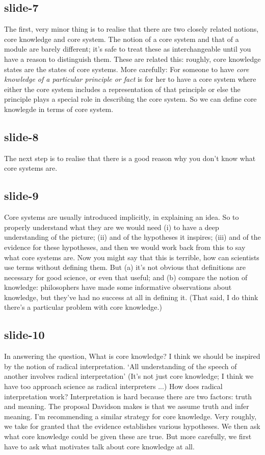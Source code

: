 \documentclass[12pt,\papersize]{extarticle}
\begin{document}
 
\subsection{slide-7}
The first, very minor thing is to realise that there are two closely related notions, core knowledge and core system.
The notion of a core system and that of a module are barely different; it's safe to treat these as interchangeable until you have a reason to distinguish them.
These are related this: roughly, core knowledge states are the states of core systems. More carefully:
For someone to have \textit{core knowledge of a particular principle or fact} is for her to have a core system where either the core system includes a representation of that principle or else the principle plays a special role in describing the core system.
So we can define core knowlegde in terms of core system.
 
 
\subsection{slide-8}
The next step is to realise that there is a good reason why you don't know what core systems are.
 
 
\subsection{slide-9}
Core systems are usually introduced implicitly, in explaining an idea.
So to properly understand what they are we would need (i) to have a deep understanding of the picture; (ii) and of the hypotheses it inspires; (iii) and of the evidence for these hypotheses, and then we would work back from this to say what core systems are.
Now you might say that this is terrible, how can scientists use terms without defining them.
But (a) it's not obvious that definitions are necessary for good science, or even that useful; and (b) compare the notion of knowledge: philosophers have made some informative observations about knowledge, but they've had no success at all in defining it.
(That said, I do think there's a particular problem with core knowledge.)
 
 
\subsection{slide-10}
In answering the question, What is core knowledge? I think we should be inspired by the notion of radical interpretation.
‘All understanding of the speech of another involves radical interpretation’
\citep[p.\ 125]{Davidson:1973jx}
(It's not just core knowledge; I think we have too approach science as radical interpreters ...)
How does radical interpretation work?
Interpretation is hard because there are two factors: truth and meaning.
The proposal Davidson makes is that we assume truth and infer meaning.
I'm recommending a similar strategy for core knowledge.
Very roughly, we take for granted that the evidence establishes various hypotheses. We then ask what core knowledge could be given these are true.
But more carefully, we first have to ask what motivates talk about core knowledge at all.
 
\end{document}
